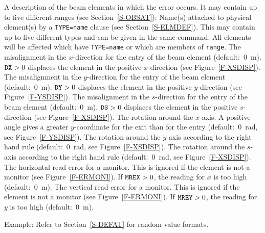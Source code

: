 \begin{mylist}
A description of the beam elements in which the error occurs.
It may contain up to five different ranges
(see Section~\ref{S-OBSAT}):
Name(s) attached to physical element(s) by a {\tt TYPE=name} clause
(see Section~\ref{S-ELMDEF}).
This may contain up to five different types
 and  can be given in the same command.
All elements will be affected which have {\tt TYPE=name}
or which are members of {\tt range}.
The misalignment in the \(x\)-direction for the entry of the
beam element (default:~0~m).
\(\hbox{\tt DX} > 0\) displaces the element in the positive \(x\)-direction
(see Figure~\ref{F-XSDISP}).
The misalignment in the \(y\)-direction for the entry of the
beam element (default:~0~m).
\(\hbox{\tt DY} > 0\) displaces the element in the positive \(y\)-direction
(see Figure~\ref{F-YSDISP}).
The misalignment in the \(s\)-direction for the entry of the
beam element (default:~0~m).
\(\hbox{\tt DS} > 0\) displaces the element in the positive \(s\)-direction
(see Figure~\ref{F-XSDISP}).
The rotation around the \(x\)-axis.
A positive angle gives a greater \(y\)-coordinate for the exit
than for the entry (default:~0~rad,
see Figure~\ref{F-YSDISP}).
The rotation around the \(y\)-axis according to the right hand
rule (default:~0~rad, see Figure~\ref{F-XSDISP}).
The rotation around the \(s\)-axis according to the right hand
rule (default:~0~rad, see Figure~\ref{F-XSDISP}).
The horizontal read error for a monitor.
This is ignored if the element is not a monitor
(see Figure~\ref{F-ERMONI}).
If \(\hbox{\tt MREX}>0\),
the reading for \(x\) is too high (default:~0~m).
The vertical read error for a monitor.
This is ignored if the element is not a monitor
(see Figure~\ref{F-ERMONI}).
If \(\hbox{\tt MREY}>0\),
the reading for \(y\) is too high (default:~0~m).
\end{mylist}
Example:
Refer to Section~\ref{S-DEFAT} for random value formats.
 
